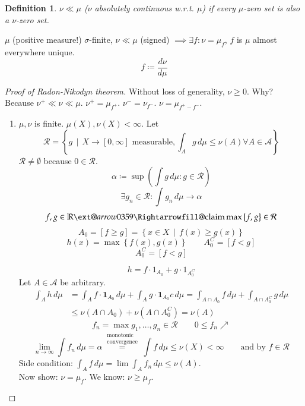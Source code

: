 \documentclass[a4paper]{article}
\makeatletter
\newcounter{lecref}[section]
\numberwithin{lecref}{section}
\theoremstyle{break}
\newtheorem{definition}[lecref]{Definition}
\newcommand{\Set}[1]{\left\{#1\right\}}
\newcommand{\SetDef}[2]{\left\{#1\,\mid\,#2\right\}}
\newcommand{\xRightarrow}[2][]{\ext@arrow 0359\Rightarrowfill@{#1}{#2}}
\makeatother
\begin{document}
\begin{definition}
  $\nu \ll \mu$ ($\nu$ absolutely continuous w.r.t. $\mu$) if every $\mu$-zero set is also a $\nu$-zero set.
\end{definition}

\begin{theorem}
  $\mu$ (positive measure!) $\sigma$-finite,
  $\nu \ll \mu$ (signed) $\implies \exists f: \nu = \mu_f$, $f$ is $\mu$ almost everywhere unique.
  \[ f \coloneqq \frac{d\nu}{d\mu} \]
\end{theorem}

\begin{proof}[Proof of Radon-Nikodyn theorem]
  Without loss of generality, $\nu \geq 0$. Why? Because $\nu^+ \ll \nu \ll \mu$. $\nu^+ = \mu_{f^+}$. $\nu^- = \nu_{f^-}$. $\nu = \mu_{f^+ - f^-}$.
  \begin{enumerate}
    \item $\mu, \nu$ is finite. $\mu(X), \nu(X) < \infty$. Let
      \[ \mathcal R = \SetDef{g}{X \to [0, \infty] \text{ measurable}, \int_A g \, d\mu \leq \nu(A) \forall A \in \mathcal A} \]
      $\mathcal R \neq \emptyset$ because $0 \in \mathcal R$.
      \[ \alpha \coloneqq \sup\left(\int g \, d\mu: g \in \mathcal R\right) \]
      \[ \exists g_n \in \mathcal R: \int g_n \, d\mu \to \alpha \]
      \[ f, g \in \mathbb R \xRightarrow{\text{claim}} \max\Set{f, g} \in \mathcal R \]
      \[ A_0 = [f \geq g] = \SetDef{x \in X}{f(x) \geq g(x)} \]
      \[ h(x) = \max\Set{f(x), g(x)} \qquad A_0^C = [f < g] \]
      \[ A_0^C = [f < g] \]

      \[ h = f \cdot \mathcal 1_{A_0} + g \cdot \mathcal 1_{A_0^C} \]
      Let $A \in \mathcal A$ be arbitrary.
      \begin{align*}
        \int_A h \, d\mu &= \int_A f \cdot \mathbf 1_{A_0} \, d\mu + \int_A g \cdot \mathbf 1_{A_0} c \, d\mu = \int_{A \cap A_0} f \, d\mu + \int_{A \cap A_0^C} g \, d\mu \\
          &\leq \nu(A \cap A_0) + \nu(A \cap A_0^C) = \nu(A)
      \end{align*}
      \[ f_n = \max{g_1, \dots, g_n} \in \mathcal R \qquad 0 \leq f_n \nearrow \]
      \[ \lim_{n \to \infty} \int f_n \, d\mu = \alpha \overset{\substack{\text{monotonic} \\ \text{convergence}}}= \int f \, d\mu \leq \nu(X) < \infty \qquad \text{and by } f \in \mathcal R \]
      Side condition: $\int_A f \, d\mu = \lim \int_A f_n \, d\mu \leq \nu(A)$. \\
      Now show: $\nu = \mu_f$. We know: $\nu \geq \mu_f$.


\end{enumerate}
\end{proof}
\end{document}
